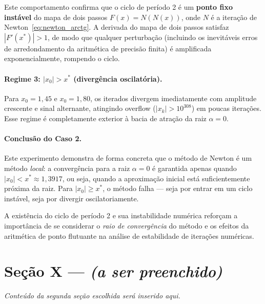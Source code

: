 \documentclass[12pt, a4paper]{article}
\begin{document}
Este comportamento confirma que o ciclo de período 2 é um \textbf{ponto fixo instável} do mapa de dois passos $F(x) = N(N(x))$, onde $N$ é a iteração de Newton~\eqref{eq:newton_arctg}. A derivada do mapa de dois passos satisfaz $|F'(x^*)| > 1$, de modo que qualquer perturbação (incluindo os inevitáveis erros de arredondamento da aritmética de precisão finita) é amplificada exponencialmente, rompendo o ciclo.

\paragraph{Regime 3: $|x_0| > x^*$ (divergência oscilatória).}
Para $x_0 = 1{,}45$ e $x_0 = 1{,}80$, os iterados divergem imediatamente com amplitude crescente e sinal alternante, atingindo overflow ($|x_k| > 10^{308}$) em poucas iterações. Esse regime é completamente exterior à bacia de atração da raiz $\alpha = 0$.

\paragraph{Conclusão do Caso 2.}
Este experimento demonstra de forma concreta que o método de Newton é um método \emph{local}: a convergência para a raiz $\alpha = 0$ é garantida apenas quando $|x_0| < x^* \approx 1{,}3917$, ou seja, quando a aproximação inicial está suficientemente próxima da raiz. Para $|x_0| \geq x^*$, o método falha --- seja por entrar em um ciclo instável, seja por divergir oscilatoriamente.

A existência do ciclo de período 2 e sua instabilidade numérica reforçam a importância de se considerar o \emph{raio de convergência} do método e os efeitos da aritmética de ponto flutuante na análise de estabilidade de iterações numéricas.


\newpage
\section{Seção X --- \textit{(a ser preenchido)}}

\textit{Conteúdo da segunda seção escolhida será inserido aqui.}
\end{document}
